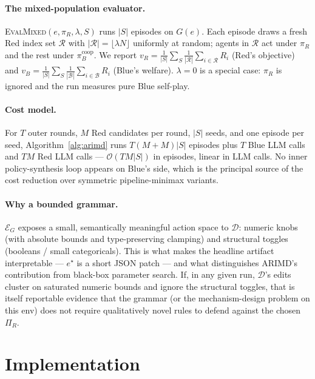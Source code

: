 \documentclass[11pt]{article}
\newcommand{\Egram}{\mathcal{E}_G}
\newcommand{\policyset}{\Pi_R}
\newcommand{\bluepol}{\pi_B^{\text{coop}}}
\begin{document}
\paragraph{The mixed-population evaluator.}
\textsc{EvalMixed}$(e, \pi_R, \lambda, S)$ runs $|S|$ episodes
on $G(e)$.  Each episode draws a fresh Red index set
$\mathcal{R}$ with $|\mathcal{R}| = \lfloor \lambda N \rfloor$
uniformly at random; agents in $\mathcal{R}$ act under $\pi_R$
and the rest under $\bluepol$.  We report
$v_R = \tfrac{1}{|S|} \sum_{S} \tfrac{1}{|\mathcal{R}|}
        \sum_{i \in \mathcal{R}} R_i$
(Red's objective) and
$v_B = \tfrac{1}{|S|} \sum_{S} \tfrac{1}{|\mathcal{B}|}
        \sum_{i \in \mathcal{B}} R_i$
(Blue's welfare).  $\lambda = 0$ is a special case: $\pi_R$ is
ignored and the run measures pure Blue self-play.

\paragraph{Cost model.}
For $T$ outer rounds, $M$ Red candidates per round, $|S|$ seeds,
and one episode per seed, Algorithm~\ref{alg:arimd} runs
$T(M + M)|S|$ episodes plus $T$ Blue LLM calls and $TM$ Red LLM
calls — $\mathcal{O}(TM|S|)$ in episodes, linear in
LLM calls.  No inner policy-synthesis loop appears on Blue's side,
which is the principal source of the cost reduction over
symmetric pipeline-minimax variants.

\paragraph{Why a bounded grammar.}
$\Egram$ exposes a small, semantically meaningful action space
to $\mathcal{D}$: numeric knobs (with absolute bounds and
type-preserving clamping) and structural toggles (booleans /
small categoricals).  This is what makes the headline artifact
interpretable — $e^\star$ is a short JSON patch — and what
distinguishes ARIMD's contribution from black-box parameter
search.  If, in any given run, $\mathcal{D}$'s edits cluster on
saturated numeric bounds and ignore the structural toggles, that
is itself reportable evidence that the grammar (or the
mechanism-design problem on this env) does not require
qualitatively novel rules to defend against the chosen
$\policyset$.

\section{Implementation}
\label{sec:implementation}
\end{document}
